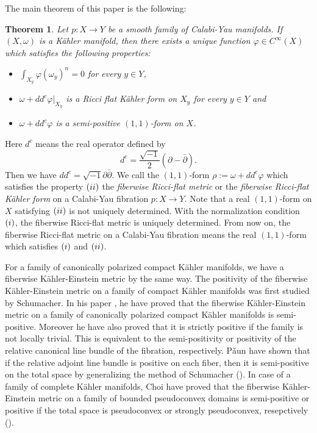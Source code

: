 \documentclass{amsart}
\newtheorem{theorem}{Theorem}[section]
\theoremstyle{definition}
\numberwithin{equation}{section}
\begin{document}
The main theorem of this paper is the following:

\begin{theorem} \label{T:main_theorem}
Let $p:X\rightarrow Y$ be a smooth family of Calabi-Yau manifolds. 
If $(X,\omega)$ is a K\"ahler manifold, then there exists a unique function ${\varphi}\in C^\infty(X)$ which satisfies the following properties:
\begin{itemize}
\item[(\romannumeral1)] $\int_{X_y}{\varphi}(\omega_y)^n=0$ for every $y\in Y$,
\item[(\romannumeral2)] $\omega+dd^c{\varphi}\vert_{X_y}$ is a Ricci flat K\"ahler form on $X_y$ for every $y\in Y$ and
\item[(\romannumeral3)] $\omega+dd^c{\varphi}$ is a semi-positive $(1,1)$-form on $X$. 
\end{itemize}
\end{theorem}

Here $d^c$ means the real operator defined by
\begin{equation*}
d^c=\frac{\sqrt{-1}}{2}{\left({\partial-\bar\partial}\right)}.
\end{equation*}
Then we have $dd^c={\sqrt{-1}}{\partial\bar\partial}$. 
We call the $(1,1)$-form $\rho:=\omega+dd^c{\varphi}$ which satisfies the property $(\romannumeral2)$ the \emph{fiberwise Ricci-flat metric} or the \emph{fiberwise Ricci-flat K\"ahler form} on a Calabi-Yau fibration $p:X\rightarrow Y$. 
Note that a real $(1,1)$-form on $X$ satisfying $(\romannumeral2)$ is not uniquely determined. 
With the normalization condition $(\romannumeral1)$, the fiberwise Ricci-flat metric is uniquely determined. From now on, the fiberwise Ricci-flat metric on a Calabi-Yau fibration means the real $(1,1)$-form which satisfies $(\romannumeral1)$ and $(\romannumeral2)$.
\medskip

For a family of canonically polarized compact K\"ahler manifolds, we have a fiberwise K\"ahler-Einstein metric by the same way. The positivity of the fiberwise K\"ahler-Einstein metric on a family of compact K\"ahler manifolds was first studied by Schumacher. In his paper \cite{Schumacher}, he have proved that the fiberwise K\"ahler-Einstein metric on a family of canonically polarized compact K\"ahler manifolds is semi-positive. Moreover he have also proved that it is strictly positive if the family is not locally trivial. This is equivalent to the semi-positivity or positivity of the relative canonical line bundle of the fibration, respectively. P\v aun have shown that if the relative adjoint line bundle is positive on each fiber, then it is semi-positive on the total space by generalizing the method of Schumacher (\cite{Paun2}). In case of a family of complete K\"ahler manifolds, Choi have proved that the fiberwise K\"ahler-Einstein metric on a family of bounded pseudoconvex domains is semi-positive or positive if the total space is pseudoconvex or strongly pseudoconvex, resepctively (\cite{Choi1, Choi2}).
\medskip
\end{document}
